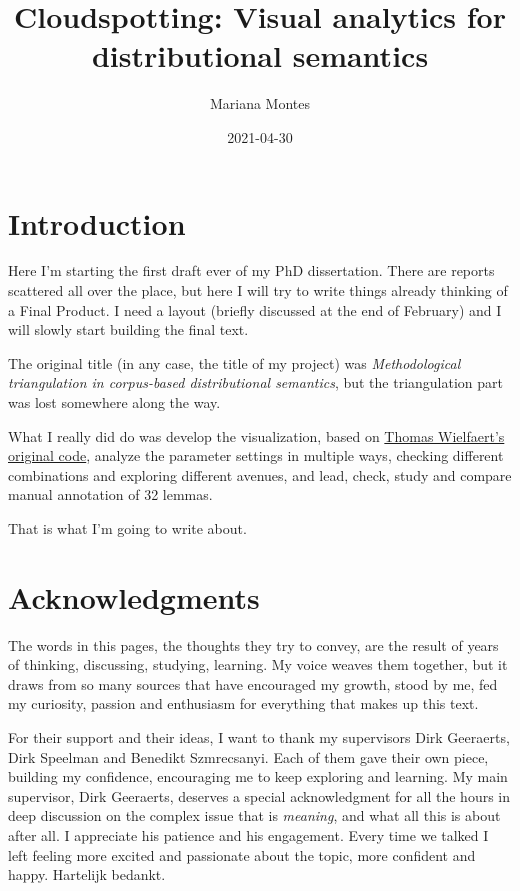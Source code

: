 \documentclass[
]{book}
\title{Cloudspotting: Visual analytics for distributional semantics}
\author{Mariana Montes}
\date{2021-04-30}
\begin{document}
\maketitle

{
\setcounter{tocdepth}{1}
\tableofcontents
}
\hypertarget{introduction}{%
\chapter*{Introduction}\label{introduction}}

Here I'm starting the first draft ever of my PhD dissertation.
There are reports scattered all over the place, but here I will try to write things already
thinking of a Final Product. I need a layout (briefly discussed at the end of February) and
I will slowly start building the final text.

The original title (in any case, the title of my project) was
\emph{Methodological triangulation in corpus-based distributional semantics},
but the triangulation part was lost somewhere along the way.

What I really did do was develop the visualization,
based on \href{https://github.com/tokenclouds/tokenclouds.github.io}{Thomas Wielfaert's original code},
analyze the parameter settings in multiple ways,
checking different combinations and exploring different avenues,
and lead, check, study and compare manual annotation of 32 lemmas.

That is what I'm going to write about.

\hypertarget{acknowledgments}{%
\chapter*{Acknowledgments}\label{acknowledgments}}

The words in this pages, the thoughts they try to convey, are the result of
years of thinking, discussing, studying, learning. My voice weaves them together,
but it draws from so many sources that have encouraged my growth, stood by me,
fed my curiosity, passion and enthusiasm for everything that makes up this text.

For their support and their ideas, I want to thank my supervisors Dirk Geeraerts,
Dirk Speelman and Benedikt Szmrecsanyi. Each of them gave their own piece, building
my confidence, encouraging me to keep exploring and learning. My main supervisor,
Dirk Geeraerts, deserves a special acknowledgment for all the hours in deep
discussion on the complex issue that is \emph{meaning}, and what all this is about after
all. I appreciate his patience and his engagement. Every time we talked I left
feeling more excited and passionate about the topic, more confident and happy.
Hartelijk bedankt.
\end{document}
